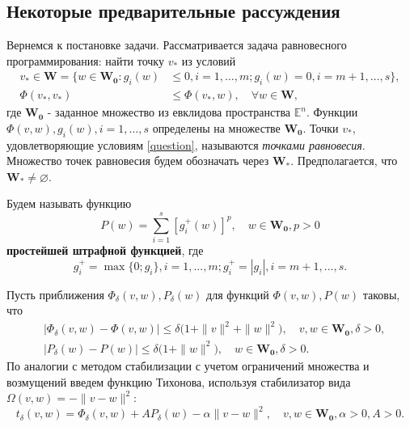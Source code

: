 \subsection{Некоторые предварительные рассуждения}
Вернемся к постановке задачи. Рассматривается задача равновесного программирования: найти точку $v_*$ из условий
\begin{equation}
\label{question}
\begin{aligned}
v_*\in\mathbf{W}=\{w\in\mathbf{W_0} :g_i(w)&\leqslant 0,i=1,\ldots,m;g_i(w)=0,i=m+1,\ldots,s\},\\
\Phi(v_*,v_*)&\leqslant\Phi(v_*,w),\quad\forall w\in\mathbf{W},
\end{aligned}
\end{equation}
где $\mathbf{W_0}$ - заданное множество из евклидова пространства $\mathbb{E}^n$. Функции $\Phi(v,w),g_i(w),i=1,\ldots,s$ определены на множестве $\mathbf{W_0}$. Точки $v_*$, удовлетворяющие условиям \eqref{question}, называются \emph{точками равновесия}. Множество точек равновесия будем обозначать через $\mathbf{W_*}$. Предполагается, что $\mathbf{W_*}\ne\varnothing$.
\begin{defin}
	Будем называть функцию
	\begin{equation}
	\label{penalty}
	P(w)=\sum_{i=1}^{s}[g^+_i(w)]^p,\quad w\in\mathbf{W_0},p>0
	\end{equation}
	\textbf{простейшей штрафной функцией}, где
	\begin{equation*}
	g^+_i=\max\{0;g_i\},i=1,...,m;g^+_i=|g_i|,i=m+1,...,s.
	\end{equation*}
\end{defin}
\noindent Пусть приближения $\Phi_{\delta}(v,w),P_{\delta}(w)$ для функций $\Phi(v,w),P(w)$ таковы, что
\begin{equation}
\label{noise}
\begin{aligned}
&\big|\Phi_{\delta}(v,w)-\Phi(v,w)\big|\leqslant \delta\big(1+\|v\|^2+\|w\|^2\big),\quad v,w\in\mathbf{W_0},\delta >0,\\
&\big|P_{\delta}(w)-P(w)\big|\leqslant \delta\big(1+\|w\|^2\big),\quad w\in\mathbf{W_0},\delta >0.
\end{aligned}
\end{equation}
По аналогии с методом стабилизации с учетом ограничений множества и возмущений введем функцию Тихонова, используя стабилизатор вида $\Omega(v,w)=-\|v-w\|^2$:
\begin{equation}
\label{Tikhonov}
t_{\delta}(v,w)=\Phi_{\delta}(v,w)+AP_{\delta}(w)-\alpha\|v-w\|^2,\quad v,w\in\mathbf{W_0},\alpha>0,A>0.
\end{equation}
